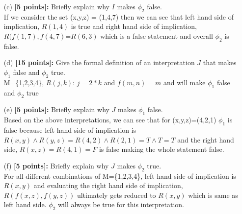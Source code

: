 \documentclass{article}
\begin{document}
\begin{enumerate}
\begin{itemize}
  \item[(c)] \textbf{[5 points]:} Briefly explain why $I$ makes
    $\phi_2$ false.\\
    If we consider the set (x,y,z) = (1,4,7) then we can see that left hand side of implication, $R(1,4)$ is true and right hand side of implication, $R(f(1,7), f(4,7)$=$R(6, 3)$ which is a false statement and overall $\phi_2$ is false.

  \item[(d)] \textbf{[15 points]:} Give the formal definition of an
    interpretation $J$ that makes $\phi_1$ false and $\phi_2$ true.\\
    M=\{1,2,3,4\}, $R(j,k)$: $j=2*k$ and $f(m,n)=m$ and will make $\phi_1$ false and $\phi_2$ true

  \item[(e)] \textbf{[5 points]:} Briefly explain why $J$ makes
    $\phi_1$ false.\\
    Based on the above interpretations, we can see that for (x,y,z)=(4,2,1) $\phi_1$ is false because left hand side of implication is $R(x,y) \land R(y,z) = R(4,2) \land R(2,1)= T \land T = T$ and the right hand side, $R(x,z)=R(4,1)=F$ is false making the whole statement false.

  \item[(f)] \textbf{[5 points]:} Briefly explain why $J$ makes
    $\phi_2$ true.\\
    For all different combinations of M=\{1,2,3,4\}, left hand side of implication is $R(x,y)$ and evaluating the right hand side of implication, $R(f(x,z),f(y,z))$ ultimately gets reduced to $R(x,y)$ which is same as left hand side. $\phi_2$ will always be true for this interpretation.

  \end{itemize}

\end{enumerate}
\end{document}
